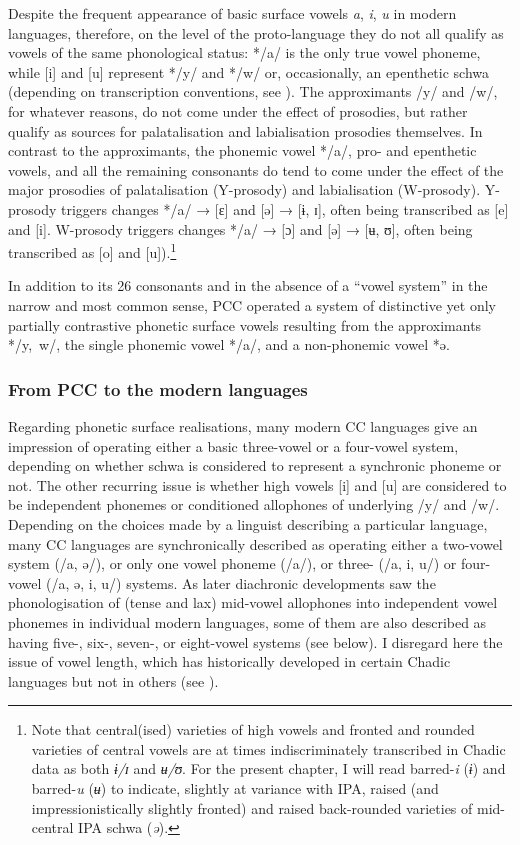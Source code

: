 \documentclass[output=paper]{langscibook}
\begin{document}
Despite the frequent appearance of basic surface vowels \textit{a}, \textit{i}, \textit{u} in modern languages, therefore, on the level of the proto-language they do not all qualify as vowels of the same phonological status: */a/ is the only true vowel phoneme, while [i] and [u] represent */y/ and */w/ or, occasionally, an epenthetic schwa (depending on transcription conventions, see ). The approximants \mbox{/y/} and /w/, for whatever reasons, do not come under the effect of prosodies, but rather qualify as sources for palatalisation and labialisation prosodies themselves. In contrast to the approximants, the phonemic vowel */a/, pro- and epenthetic vowels, and all the remaining consonants do tend to come under the effect of the major prosodies of palatalisation (Y-prosody) and labialisation (W-prosody). Y-prosody triggers changes */a/ → [ɛ] and [ə] → [ɨ, ɪ], often being transcribed as [e] and [i]. W-prosody triggers changes */a/ → [ɔ] and [ə] → [ʉ, ʊ], often being transcribed as [o] and [u]).\footnote{Note that central(ised) varieties of high vowels and fronted and rounded varieties of central vowels are at times indiscriminately transcribed in Chadic data as both \textit{ɨ/ɪ} and \textit{ʉ/ʊ}. For the present chapter, I will read barred-\textit{i} (\textit{ɨ}) and barred-\textit{u} (\textit{ʉ}) to indicate, slightly at variance with IPA, raised (and impressionistically slightly fronted) and raised back-rounded varieties of mid-central IPA schwa (\textit{ə}).}

In addition to its 26 consonants and in the absence of a ``vowel system'' in the narrow and most common sense, PCC operated a system of distinctive yet only partially contrastive phonetic surface vowels resulting from the approximants \mbox{*/y, w/}, the single phonemic vowel \mbox{*/a/}, and a non-phonemic vowel *ə.

\subsubsection{From PCC to the modern languages}
\largerpage[2]
\label{sec:Wolff:2.3.2}
Regarding phonetic surface realisations, many modern CC languages give an impression of operating either a basic three-vowel or a four-vowel system, depending on whether schwa is considered to represent a synchronic phoneme or not. The other recurring issue is whether high vowels [i] and [u] are considered to be independent phonemes or conditioned allophones of underlying /y/ and \mbox{/w/}. Depending on the choices made by a linguist describing a particular language, many CC languages are synchronically described as operating either a two-vowel system (/a, ə/), or only one vowel phoneme \mbox{(/a/)}, or three- \mbox{(/a,} i, \mbox{u/)} or four-vowel \mbox{(/a,} ə, i, \mbox{u/)} systems. As later diachronic developments saw the phonologisation of (tense and lax) mid-vowel allophones into independent vowel phonemes in individual modern languages, some of them are also described as having five-, six-, seven-, or eight-vowel systems (see below). I disregard here the issue of vowel length, which has historically developed in certain Chadic languages but not in others (see \citealt{Wolff2022a, Wolffinpressb}). 
\end{document}
